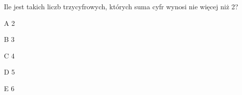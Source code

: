 \begin{tresc}
Ile jest takich liczb trzycyfrowych, których suma cyfr wynosi nie więcej niż 2?
\end{tresc}
\begin{wariant}{A} 2 \end{wariant}
\begin{wariant}{B} 3 \end{wariant}
\begin{wariant}{C} 4 \end{wariant}
\begin{wariant}{D} 5 \end{wariant}
\begin{wariant}{E} 6 \end{wariant}
